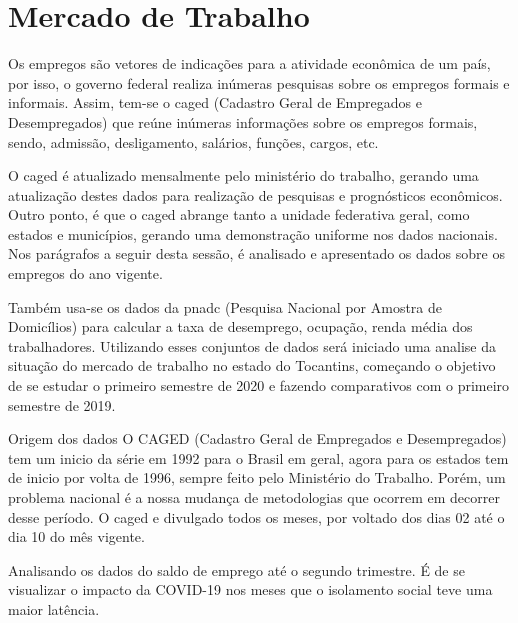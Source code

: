 \chapter{Mercado de Trabalho}

\par Os empregos são  vetores de indicações para a atividade econômica de um país, por isso, o governo federal realiza inúmeras pesquisas sobre os empregos formais e informais. Assim, tem-se o \acrshort{caged} (Cadastro Geral de Empregados e Desempregados) que reúne inúmeras informações sobre os empregos formais, sendo, admissão, desligamento, salários, funções, cargos, etc.
\par O \acrshort{caged} é atualizado mensalmente pelo ministério do trabalho, gerando uma atualização destes dados para realização de pesquisas e prognósticos econômicos. Outro ponto, é que o \acrshort{caged} abrange tanto a unidade federativa geral, como estados e municípios, gerando uma demonstração uniforme nos dados nacionais. Nos parágrafos a seguir desta sessão, é analisado e apresentado os dados sobre os empregos do ano vigente.
\par Também usa-se os dados da \acrshort{pnadc} (Pesquisa Nacional por Amostra de Domicílios) para calcular a taxa de desemprego, ocupação, renda média dos trabalhadores. Utilizando esses conjuntos de dados será iniciado uma analise da situação do mercado de trabalho no estado do Tocantins, começando  o objetivo de se estudar o primeiro semestre de 2020 e fazendo comparativos com o primeiro semestre de 2019.

\begin{smbox}[label={labelbox},nameref={Empregos}]{Origem dos dados}
	O CAGED (Cadastro Geral de Empregados e Desempregados) tem um inicio da série em 1992 para o Brasil em geral, agora para os estados tem de inicio por volta de 1996, sempre feito pelo Ministério do Trabalho. Porém, um problema nacional é a nossa mudança de metodologias que ocorrem em decorrer desse período. O \acrshort{caged} e divulgado todos os meses, por voltado dos dias 02 até o dia 10 do mês vigente.
\end{smbox}

\par Analisando os dados do saldo de emprego até o segundo trimestre. É de se visualizar o impacto da COVID-19 nos meses que o isolamento social teve uma maior latência.

